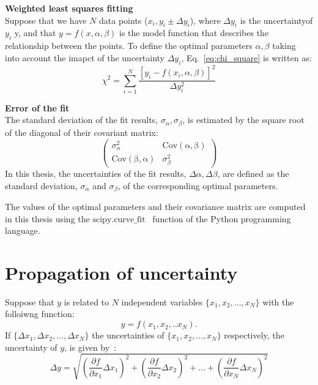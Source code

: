 \normalsize{\textbf{Weighted least squares fitting}}\\
Suppose that we have $N$ data points ($x_i, y_i \pm \Delta y_i $), where $ \Delta y_i$ is the uncertaintyof $y_i$ y, and that $y=f(x,\alpha, \beta)$ is the model function that describes the relationship between the points. To define the optimal parameters $\alpha, \beta$ taking into account the imapct of the uncertainty $\Delta y_i$, Eq.~\eqref{eq:chi_square} is written as:
\begin{equation}\label{eq:chi_square_weights}
    \chi^2 = \sum_{i=1}^{N}\frac{[y_{i}-f(x_{i},\alpha, \beta)]^2}{\Delta y_i^2}
\end{equation}

\normalsize{\textbf{Error of the fit}}\\
The standard deviation of the fit results, $\sigma_\alpha, \sigma_\beta$, is estimated by the square root of the diagonal of their covariant matrix:
\begin{equation}\label{eq:cov_matrix_fit_results}
    \begin{pmatrix}
        \sigma_{\alpha}^2 & \mathrm{Cov(\alpha, \beta)}\\
        \mathrm{Cov(\beta, \alpha)} & \sigma_{\beta}^2
        \end{pmatrix}
\end{equation}
In this thesis, the uncertainties of the fit results, $\Delta \alpha, \Delta \beta$, are defined as the standard deviation, $\sigma_{\alpha}$ and  $\sigma_{\beta}$, of the corresponding optimal parameters.

The values of the optimal parameters and their covariance matrix are computed in this thesis using the $\mathrm{scipy.curve \_ fit}$~\cite{scipy_curve_fit} function of the Python programming language.



\section{Propagation of uncertainty}\label{app:uncertainty_propagation}
Suppose that $y$ is related to $N$ independent variables $\{x_1, x_2, ..., x_N\}$ with the folloiwng function:
\begin{equation}
    y=f(x_1, x_2, .. x_N).
\end{equation}
If $\{\Delta x_1, \Delta x_2, ..., \Delta x_N\}$ the uncertainties of $\{x_1, x_2, ..., x_N\}$ respectively, the uncertainty of $y$, is given by~\cite{lvp.b313005720130101}:
\begin{equation}\label{eq:uncertainty_propagation}
    \Delta y = \sqrt{\left ( \frac{\partial f}{\partial x_1} \Delta x_1  \right )^2 + \left ( \frac{\partial f}{\partial x_2} \Delta x_2  \right )^2 + \dots + \left ( \frac{\partial f}{\partial x_N} \Delta x_N  \right )^2}
\end{equation}


